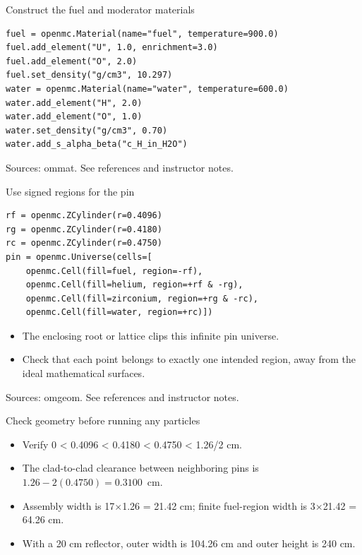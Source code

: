 \documentclass[aspectratio=169,11pt]{beamer}
\begin{document}
\begin{frame}[t,fragile]{Construct the fuel and moderator materials}
\begin{lstlisting}
fuel = openmc.Material(name="fuel", temperature=900.0)
fuel.add_element("U", 1.0, enrichment=3.0)
fuel.add_element("O", 2.0)
fuel.set_density("g/cm3", 10.297)
water = openmc.Material(name="water", temperature=600.0)
water.add_element("H", 2.0)
water.add_element("O", 1.0)
water.set_density("g/cm3", 0.70)
water.add_s_alpha_beta("c_H_in_H2O")
\end{lstlisting}
\vfill{\fontsize{6.5}{8}\selectfont\color{UTgray} Sources: ommat. See references and instructor notes.\par}
\end{frame}
\begin{frame}[t,fragile]{Use signed regions for the pin}
\begin{lstlisting}
rf = openmc.ZCylinder(r=0.4096)
rg = openmc.ZCylinder(r=0.4180)
rc = openmc.ZCylinder(r=0.4750)
pin = openmc.Universe(cells=[
    openmc.Cell(fill=fuel, region=-rf),
    openmc.Cell(fill=helium, region=+rf & -rg),
    openmc.Cell(fill=zirconium, region=+rg & -rc),
    openmc.Cell(fill=water, region=+rc)])
\end{lstlisting}
\fontsize{10.5}{12.5}\selectfont
\begin{itemize}\setlength{\itemsep}{2mm}
\item The enclosing root or lattice clips this infinite pin universe.
\item Check that each point belongs to exactly one intended region, away from the ideal mathematical surfaces.
\end{itemize}
\vfill{\fontsize{6.5}{8}\selectfont\color{UTgray} Sources: omgeom. See references and instructor notes.\par}
\end{frame}
\begin{frame}[t,fragile]{Check geometry before running any particles}
\fontsize{11.5}{14}\selectfont
\begin{itemize}\setlength{\itemsep}{2mm}
\item Verify 0 < 0.4096 < 0.4180 < 0.4750 < 1.26/2 cm.
\item The clad-to-clad clearance between neighboring pins is $1.26 - 2(0.4750) = 0.3100$~cm.
\item Assembly width is 17$\times$1.26 = 21.42 cm; finite fuel-region width is 3$\times$21.42 = 64.26 cm.
\item With a 20 cm reflector, outer width is 104.26 cm and outer height is 240 cm.
\end{itemize}
\end{frame}
\end{document}
